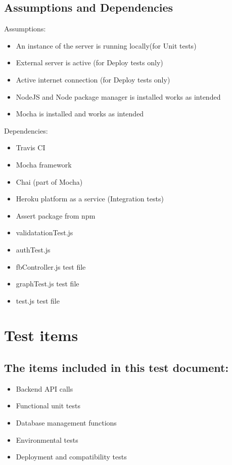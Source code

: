 \documentclass{article}
\begin{document}
\subsection{Assumptions and Dependencies}\label{subsec:assumptions}
Assumptions:
\begin{itemize}
	\item An instance of the server is running locally(for Unit tests)
	\item External server is active (for Deploy tests only)
	\item Active internet connection (for Deploy tests only)
	\item NodeJS and Node package manager is installed works as intended
	\item Mocha is installed and works as intended
\end{itemize}
Dependencies:
\begin{itemize}
	\item Travis CI 
	\item Mocha framework
	\item Chai (part of Mocha)
	\item Heroku platform as a service (Integration tests)
	\item Assert package from npm
	\item validatationTest.js
	\item authTest.js
	\item fbController.js test file
	\item graphTest.js test file
	\item test.js test file
\end{itemize}


\section{Test items}\label{sec:testItems}
\subsection{The items included in this test document:}
\begin{itemize}
	\item Backend API calls
	\item Functional unit tests
	\item Database management functions
	\item Environmental tests 
	\item Deployment and compatibility tests
\end{itemize} 
\end{document}
